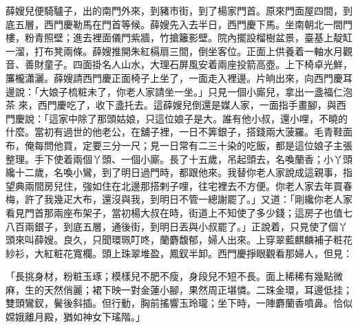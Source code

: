 \begin{showcontents}{}
薛嫂兒便騎驢子，出的南門外來，到豬市街，到了楊家門首。原來門面屋四間，到底五層，西門慶勒馬在門首等候。薛嫂先入去半日，西門慶下馬。坐南朝北一間門樓，粉青照壁；進去裡面儀門紫牆，竹搶籬影壁。院內擺設榴樹盆景，臺基上靛缸一溜，打布凳兩條。薛嫂推開朱紅槅扇三間，倒坐客位。正面上供養着一軸水月觀音、善財童子。四面掛名人山水，大理石屏風安着兩座投箭高壺。上下椅卓光鮮，簾櫳瀟灑。薛嫂請西門慶正面椅子上坐了，一面走入裡邊。片晌出來，向西門慶耳邊說：「大娘子梳粧未了，你老人家請坐一坐。」只見一個小廝兒，拿出一盞福仁泡茶 來，西門慶吃了，收下盞托去。這薛嫂兒倒還是媒人家，一面指手畫腳，與西門慶說：「這家中除了那頭姑娘，只這位娘子是大。誰有他小叔，還小哩，不曉的什麼。當初有過世的他老公，在舖子裡，一日不筭銀子，搭錢兩大菠羅。毛青鞋面布，俺每問他買，定要三分一尺；見一日常有二三十染的吃飯，都是這位娘子主張整理。手下使着兩個丫頭、一個小廝。長了十五歲，吊起頭去，名喚蘭香；小丫頭纔十二歲，名喚小鸞，到了明日過門時，都跟他來。我替你老人家說成這親事，指望典兩間房兒住，強如住在北邊那搭剌子哩，往宅裡去不方便。你老人家去年買春梅，許了我幾疋大布，還沒與我，到明日不管一總謝罷了。」又道：「剛纔你老人家看見門首那兩座布架子，當初楊大叔在時，街道上不知使了多少錢；這房子也值七八百兩銀子，到底五層，通後街，到明日丟與小叔罷了。」正說着，只見使了個丫頭來叫薛嫂。良久，只聞環珮叮咚，蘭麝馥郁，婦人出來。上穿翠藍麒麟補子粧花紗衫，大紅粧花寬欄。頭上珠翠堆盈，鳳釵半卸。西門慶掙眼觀看那婦人，但見：

「長挑身材，粉粧玉琢；模樣兒不肥不瘦，身段兒不短不長。面上稀稀有幾點微麻，生的天然俏麗；裙下映一對金蓮小腳，果然周正堪憐。二珠金環，耳邊低挂；雙頭鸞釵，鬢後斜插。但行動，胸前搖響玉玲瓏；坐下時，一陣麝蘭香噴鼻。恰似嫦娥離月殿，猶如神女下瑤階。」


\end{showcontents}
